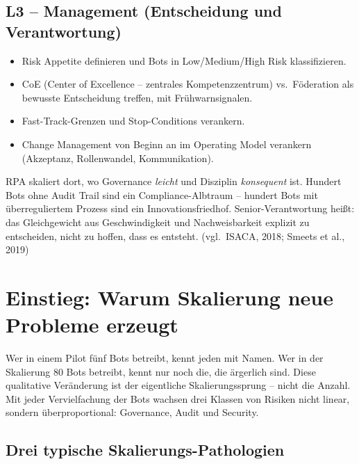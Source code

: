 \documentclass[11pt,a4paper,oneside]{article}
\newcommand{\quelle}[1]{{\footnotesize\color{lpGray}(#1)}}
\begin{document}
\subsection*{L3 -- Management (Entscheidung und Verantwortung)}
\begin{itemize}
  \item Risk Appetite definieren und Bots in Low/Medium/High Risk klassifizieren.
  \item CoE (Center of Excellence -- zentrales Kompetenzzentrum) vs.\ Föderation als bewusste Entscheidung treffen, mit Frühwarnsignalen.
  \item Fast-Track-Grenzen und Stop-Conditions verankern.
  \item Change Management von Beginn an im Operating Model verankern (Akzeptanz, Rollenwandel, Kommunikation).
\end{itemize}

\begin{merkbox}
RPA skaliert dort, wo Governance \emph{leicht} und Disziplin \emph{konsequent} ist. Hundert Bots ohne Audit Trail sind ein Compliance-Albtraum -- hundert Bots mit überreguliertem Prozess sind ein Innovationsfriedhof. Senior-Verantwortung heißt: das Gleichgewicht aus Geschwindigkeit und Nachweisbarkeit explizit zu entscheiden, nicht zu hoffen, dass es entsteht. \quelle{vgl.\ ISACA, 2018; Smeets et al., 2019}
\end{merkbox}

\clearpage

\section{Einstieg: Warum Skalierung neue Probleme erzeugt}

Wer in einem Pilot fünf Bots betreibt, kennt jeden mit Namen. Wer in der Skalierung 80 Bots betreibt, kennt nur noch die, die ärgerlich sind. Diese qualitative Veränderung ist der eigentliche Skalierungssprung -- nicht die Anzahl. Mit jeder Vervielfachung der Bots wachsen drei Klassen von Risiken nicht linear, sondern überproportional: Governance, Audit und Security.

\subsection{Drei typische Skalierungs-Pathologien}
\end{document}
